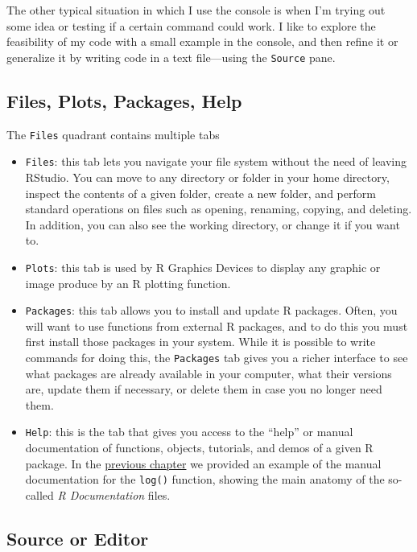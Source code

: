 \documentclass[
]{book}
\begin{document}
The other typical situation in which I use the console is when I'm trying out
some idea or testing if a certain command could work. I like to explore the
feasibility of my code with a small example in the console, and then refine it
or generalize it by writing code in a text file---using the \texttt{Source} pane.

\hypertarget{files-plots-packages-help}{%
\subsection{Files, Plots, Packages, Help}\label{files-plots-packages-help}}

The \texttt{Files} quadrant contains multiple tabs

\begin{itemize}
\item
  \texttt{Files}: this tab lets you navigate your file system without the need of
  leaving RStudio. You can move to any directory or folder in your home directory,
  inspect the contents of a given folder, create a new folder, and perform
  standard operations on files such as opening, renaming, copying, and deleting.
  In addition, you can also see the working directory, or change it if you want to.
\item
  \texttt{Plots}: this tab is used by R Graphics Devices to display any graphic or
  image produce by an R plotting function.
\item
  \texttt{Packages}: this tab allows you to install and update R packages. Often, you
  will want to use functions from external R packages, and to do this you must
  first install those packages in your system. While it is possible to write
  commands for doing this, the \texttt{Packages} tab gives you a richer interface to
  see what packages are already available in your computer, what their versions
  are, update them if necessary, or delete them in case you no longer need them.
\item
  \texttt{Help}: this is the tab that gives you access to the ``help'' or manual
  documentation of functions, objects, tutorials, and demos of a given R package.
  In the \protect\hyperlink{help-documentation}{previous chapter} we provided an example of the
  manual documentation for the \texttt{log()} function, showing the main anatomy of the
  so-called \emph{R Documentation} files.
\end{itemize}

\hypertarget{source-or-editor}{%
\subsection{Source or Editor}\label{source-or-editor}}
\end{document}
